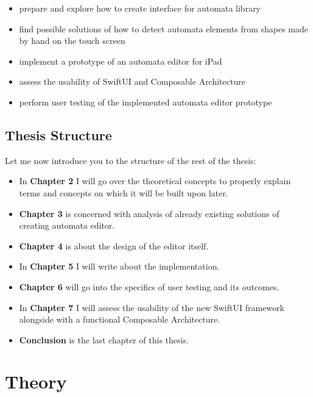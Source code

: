 \documentclass[thesis=B,english]{FITthesis}[2019/12/23]
\begin{document}
\begin{itemize}
	\item prepare and explore how to create interface for automata library
	\item find possible solutions of how to detect automata elements from shapes made by hand on the touch screen
	\item implement a prototype of an automata editor for iPad
	\item assess the usability of SwiftUI and Composable Architecture
	\item perform user testing of the implemented automata editor prototype
\end{itemize}

\section{Thesis Structure}

Let me now introduce you to the structure of the rest of the thesis:

\begin{itemize}
\item In \textbf{Chapter 2} I will go over the theoretical concepts to properly explain terms and concepts on which it will be built upon later.

\item \textbf{Chapter 3} is concerned with analysis of already existing solutions of creating automata editor.

\item \textbf{Chapter 4} is about the design of the editor itself.

\item In \textbf{Chapter 5} I will write about the implementation.

\item \textbf{Chapter 6} will go into the specifics of user testing and its outcomes.

\item In \textbf{Chapter 7} I will assess the usability of the new SwiftUI framework alongside with a functional Composable Architecture.

\item \textbf{Conclusion} is the last chapter of this thesis.

\end{itemize}

\chapter{Theory}
\end{document}
